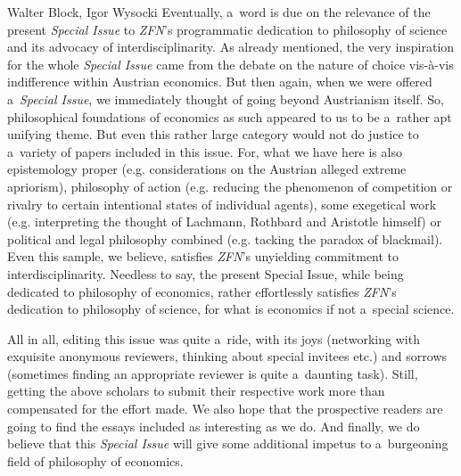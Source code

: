 \begin{editorialeng2auth}{Walter Block, Igor Wysocki}
Eventually, a~word is due on the relevance of the present \textit{Special Issue} to \textit{ZFN}'s programmatic dedication to philosophy of science and its advocacy of interdisciplinarity. As already mentioned, the very inspiration for the whole \textit{Special Issue} came from the debate on the nature of choice vis-à-vis indifference within Austrian economics. But then again, when we were offered a~\textit{Special Issue}, we immediately thought of going beyond Austrianism itself. So, philosophical foundations of economics as such appeared to us to be a~rather apt unifying theme. But even this rather large category would not do justice to a~variety of papers included in this issue. For, what we have here is also epistemology proper (e.g. considerations on the Austrian alleged extreme apriorism), philosophy of action (e.g. reducing the phenomenon of competition or rivalry to certain intentional states of individual agents), some exegetical work (e.g. interpreting the thought of Lachmann, Rothbard and Aristotle himself) or political and legal philosophy combined (e.g. tacking the paradox of blackmail). Even this sample, we believe, satisfies \textit{ZFN}'s unyielding commitment to interdisciplinarity. Needless to say, the present Special Issue, while being dedicated to philosophy of economics, rather effortlessly satisfies \textit{ZFN}'s dedication to philosophy of science, for what is economics if not a~special science.



All in all, editing this issue was quite a~ride, with its joys (networking with exquisite anonymous reviewers, thinking about special invitees etc.) and sorrows (sometimes finding an appropriate reviewer is quite a~daunting task). Still, getting the above scholars to submit their respective work more than compensated for the effort made. We also hope that the prospective readers are going to find the essays included as interesting as we do. And finally, we do believe that this \textit{Special Issue} will give some additional impetus to a~burgeoning field of philosophy of economics.









\end{editorialeng2auth}

